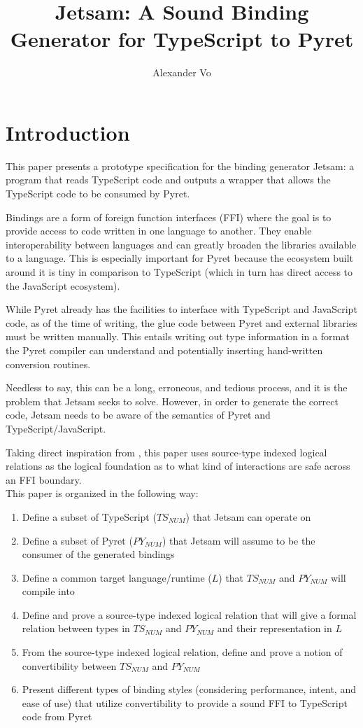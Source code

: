 \documentclass{article}
\title{Jetsam: A Sound Binding Generator for TypeScript to Pyret}
\author{Alexander Vo}
\date{}
\begin{document}
	\maketitle
	\tableofcontents
	\pagebreak
	
	\section{Introduction}
	This paper presents a prototype specification for the binding generator Jetsam: a program that reads TypeScript code and outputs a wrapper that allows the TypeScript code to be consumed by Pyret. 
	
	Bindings are a form of foreign function interfaces (FFI) where the goal is to provide access to code written in one language to another. They enable interoperability between languages and can greatly broaden the libraries available to a language. This is especially important for Pyret because the ecosystem built around it is tiny in comparison to TypeScript (which in turn has direct access to the JavaScript ecosystem). 
	
	While Pyret already has the facilities to interface with TypeScript and JavaScript code, as of the time of writing, the glue code between Pyret and external libraries must be written manually. This entails writing out type information in a format the Pyret compiler can understand and potentially inserting hand-written conversion routines.
	
	Needless to say, this can be a long, erroneous, and tedious process, and it is the problem that Jetsam seeks to solve. However, in order to generate the correct code, Jetsam needs to be aware of the semantics of Pyret and TypeScript/JavaScript. 
	
	Taking direct inspiration from \textcite{FFI}, this paper uses source-type indexed logical relations as the logical foundation as to what kind of interactions are safe across an FFI boundary.\\
	
	
	This paper is organized in the following way:
	\begin{enumerate}
		\item Define a subset of TypeScript ($TS_{NUM}$) that Jetsam can operate on
		\item Define a subset of Pyret ($PY_{NUM}$) that Jetsam will assume to be the consumer of the generated bindings
		\item Define a common target language/runtime ($L$) that $TS_{NUM}$ and $PY_{NUM}$ will compile into
		\item Define and prove a source-type indexed logical relation that will give a formal relation between types in $TS_{NUM}$ and $PY_{NUM}$ and their representation in $L$
		\item From the source-type indexed logical relation, define and prove a notion of convertibility between $TS_{NUM}$ and $PY_{NUM}$
		\item Present different types of binding styles (considering performance, intent, and ease of use) that utilize convertibility to provide a sound FFI to TypeScript code from Pyret
	\end{enumerate}
\end{document}

